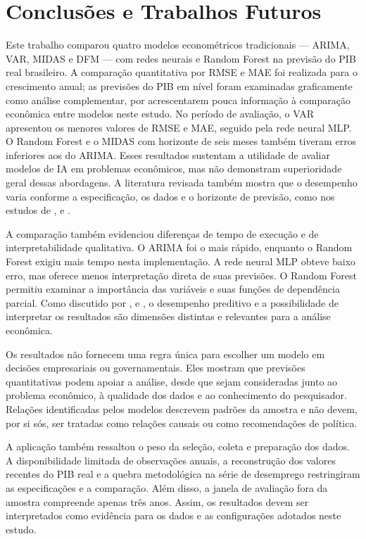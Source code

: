 \chapter{Conclusões e Trabalhos Futuros}
\label{chap:conclusoes-e-trabalhos-futuros}


Este trabalho comparou quatro modelos econométricos tradicionais — ARIMA, VAR, MIDAS e DFM — com redes neurais e Random Forest na previsão do PIB real brasileiro. A comparação quantitativa por RMSE e MAE foi realizada para o crescimento anual; as previsões do PIB em nível foram examinadas graficamente como análise complementar, por acrescentarem pouca informação à comparação econômica entre modelos neste estudo. No período de avaliação, o VAR apresentou os menores valores de RMSE e MAE, seguido pela rede neural MLP. O Random Forest e o MIDAS com horizonte de seis meses também tiveram erros inferiores aos do ARIMA. Esses resultados sustentam a utilidade de avaliar modelos de IA em problemas econômicos, mas não demonstram superioridade geral dessas abordagens. A literatura revisada também mostra que o desempenho varia conforme a especificação, os dados e o horizonte de previsão, como nos estudos de ,  e .

A comparação também evidenciou diferenças de tempo de execução e de interpretabilidade qualitativa. O ARIMA foi o mais rápido, enquanto o Random Forest exigiu mais tempo nesta implementação. A rede neural MLP obteve baixo erro, mas oferece menos interpretação direta de suas previsões. O Random Forest permitiu examinar a importância das variáveis e suas funções de dependência parcial. Como discutido por ,  e , o desempenho preditivo e a possibilidade de interpretar os resultados são dimensões distintas e relevantes para a análise econômica.

Os resultados não fornecem uma regra única para escolher um modelo em decisões empresariais ou governamentais. Eles mostram que previsões quantitativas podem apoiar a análise, desde que sejam consideradas junto ao problema econômico, à qualidade dos dados e ao conhecimento do pesquisador. Relações identificadas pelos modelos descrevem padrões da amostra e não devem, por si sós, ser tratadas como relações causais ou como recomendações de política.

A aplicação também ressaltou o peso da seleção, coleta e preparação dos dados. A disponibilidade limitada de observações anuais, a reconstrução dos valores recentes do PIB real e a quebra metodológica na série de desemprego restringiram as especificações e a comparação. Além disso, a janela de avaliação fora da amostra compreende apenas três anos. Assim, os resultados devem ser interpretados como evidência para os dados e as configurações adotados neste estudo.

